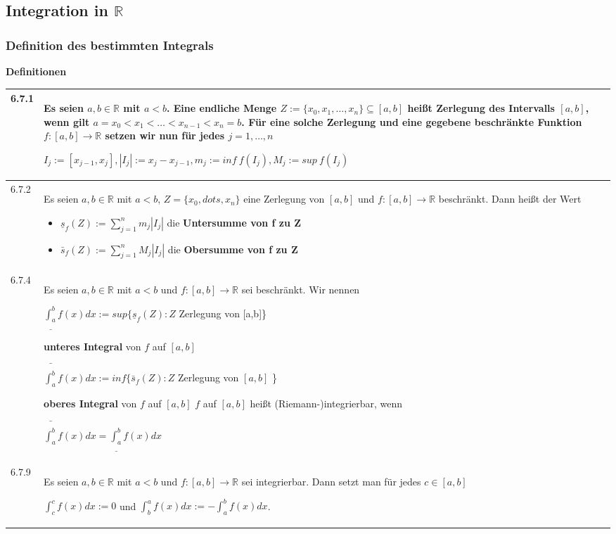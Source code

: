 \subsection{Integration in $\mathbb{R}$}
\subsubsection{Definition des bestimmten Integrals}
    \noindent
    \textbf{Definitionen}
      
    \begin{longtable}{p{1cm} p{16cm}}
        \toprule

        6.7.1 & Es seien $a,b \in \mathbb{R}$ mit $a < b$. Eine endliche Menge $Z:= \{ x_0, x_1, \dots, x_n \} \subseteq [a,b]$ heißt
                \textbf{Zerlegung} des Intervalls $[a,b]$, wenn gilt $a = x_0 < x_1 < \dots < x_{n-1} < x_n = b$. \hfill \break
                Für eine solche Zerlegung und eine gegebene beschränkte Funktion $f: [a,b] \rightarrow \mathbb{R}$ setzen wir nun
                für jedes $j = 1,\dots,n$ \hfill \break
                \centerline{$ I_j := [x_{j-1},x_j], |I_j| := x_j - x_{j-1}, m_j := inf~f(I_j), M_j := sup~f(I_j)$} \\
        \midrule
        6.7.2 & Es seien $a,b \in \mathbb{R}$ mit $a < b$, $Z = \{ x_0, dots, x_n\}$ eine Zerlegung von $[a,b]$ und $f:[a,b]\rightarrow \mathbb{R}$
                beschränkt. Dann heißt der Wert 
                \begin{itemize}[topsep=-0.5cm]
                    \item[] $\underline{s}_f(Z) := \sum^{n}_{j=1} m_j |I_j|$ die \textbf{Untersumme von f zu Z}
                    \item[] $\bar{s}_f(Z) := \sum^{n}_{j=1} M_j |I_j|$ die \textbf{Obersumme von f zu Z}
                \end{itemize} \vspace{-0cm} \\
        \midrule
        6.7.4 & Es seien $a, b \in \mathbb{R}$ mit $ a < b$ und $f: [a,b] \rightarrow \mathbb{R}$ sei beschränkt. \hfill \break
                Wir nennen \hfill \break
                \centerline{$ \underline{\int_a^b} f(x) dx:= sup\{ \underline{s}_f(Z):Z$ Zerlegung von [a,b]\}}
                \textbf{unteres Integral} von $f$ auf $[a,b]$ \hfill \break
                \centerline{$ \bar{\int^b_a}f(x) dx := inf\{ \bar{s}_f (Z): Z$ Zerlegung von $[a,b]$ \} }
                \textbf{oberes Integral} von $f$ auf $[a,b]$ \hfill \break
                $f$ auf $[a,b]$ heißt (Riemann-)integrierbar, wenn \hfill \break
                \centerline{$\bar{\int^b_a}f(x) dx = \underline{\int_a^b} f(x) dx$}\\
        \midrule
        6.7.9 & Es seien $a, b \in \mathbb{R}$ mit $a < b$ und $f: [a,b] \rightarrow \mathbb{R}$ sei integrierbar. Dann setzt man für jedes
                $ c \in [a,b]$ \hfill \break
                \centerline{$ \int_c^c f(x)dx := 0$ und $\int_b^a f(x) dx := - \int_a^b f(x) dx$.} \\
        

        \bottomrule

    \end{longtable}
    

